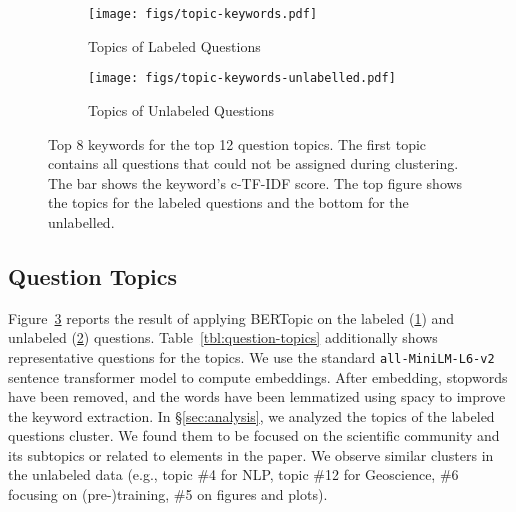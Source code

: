 \clearpage


\begin{figure}[!b]
     \centering
     \begin{subfigure}[b]{\textwidth}
         \centering
         \texttt{[image: figs/topic-keywords.pdf]}
         \caption{Topics of Labeled Questions}
         \label{fig:question-topics-labelled}
     \end{subfigure}
     \hfill
     \vspace{0.5em}
     \begin{subfigure}[b]{\textwidth}
         \centering
         \texttt{[image: figs/topic-keywords-unlabelled.pdf]}
         \caption{Topics of Unlabeled Questions}
         \label{fig:question-topics-unlabelled}
     \end{subfigure}
        \caption{Top 8 keywords for the top 12 question topics. The first topic contains all questions that could not be assigned during clustering. The bar shows the keyword's c-TF-IDF score. The top figure shows the topics for the labeled questions and the bottom for the unlabelled.}
        \label{fig:question-topic-keywords}
\end{figure}

\begin{multicols*}{2}
\section{Question Topics}\label{sec:appendix-question-topcis}
Figure~\ref{fig:question-topic-keywords} reports the result of applying BERTopic \citep{grootendorst-bertopic-2022} on the labeled (\ref{fig:question-topics-labelled}) and unlabeled (\ref{fig:question-topics-unlabelled}) questions. Table~\ref{tbl:question-topics} additionally shows representative questions for the topics. We use the standard \texttt{all-MiniLM-L6-v2} sentence transformer model to compute embeddings. After embedding, stopwords have been removed, and the words have been lemmatized using spacy \citep{spaCy2020} to improve the keyword extraction. In \S\ref{sec:analysis}, we analyzed the topics of the labeled questions cluster. We found them to be focused on the scientific community and its subtopics or related to elements in the paper. We observe similar clusters in the unlabeled data (e.g., topic \#4 for NLP, topic \#12 for Geoscience, \#6 focusing on (pre-)training, \#5 on figures and plots).
\end{multicols*}


\clearpage


